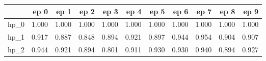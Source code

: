 \begin{tabular}{lrrrrrrrrrr}
\toprule
{} &   ep 0 &   ep 1 &   ep 2 &   ep 3 &   ep 4 &   ep 5 &   ep 6 &   ep 7 &   ep 8 &   ep 9 \\
\midrule
hp\_0 &  1.000 &  1.000 &  1.000 &  1.000 &  1.000 &  1.000 &  1.000 &  1.000 &  1.000 &  1.000 \\
hp\_1 &  0.917 &  0.887 &  0.848 &  0.894 &  0.921 &  0.897 &  0.944 &  0.954 &  0.904 &  0.907 \\
hp\_2 &  0.944 &  0.921 &  0.894 &  0.801 &  0.911 &  0.930 &  0.930 &  0.940 &  0.894 &  0.927 \\
\bottomrule
\end{tabular}
